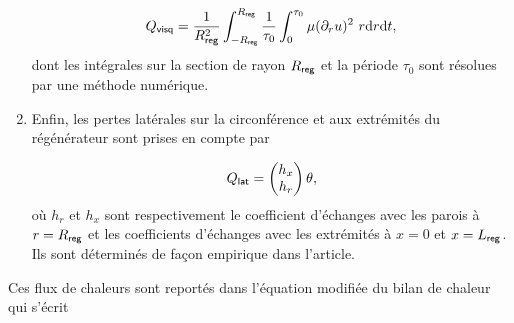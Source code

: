 \begin{enumerate}[label=\textbf{(\roman*)}]
\begin{equation}
Q_{\sf visq} = \frac{1}{R_{\sf reg}^2} \int_{-R_{\sf reg}}^{R_{\sf reg}} \frac{1}{\tau_0} \int_0^{\tau_0} \mu (\partial_r u)^2\ r \mathrm{d} r \mathrm{d} t,
\label{eq:FluxVisq_Lotton}
\end{equation}
dont les intégrales sur la section de rayon $R_{\sf reg}$ et la période $\tau_0$ sont résolues par une méthode numérique.

\item Enfin, les pertes latérales sur la circonférence et aux extrémités du régénérateur sont prises en compte par

\begin{equation}
Q_{\sf lat} = \begin{pmatrix}h_x\\h_r\end{pmatrix} \theta,
\label{eq:FluxLat_Lotton}
\end{equation}
où $h_r$ et $h_x$ sont respectivement le coefficient d'échanges avec les parois à $r = R_{\sf reg}$ et les coefficients d'échanges avec les extrémités à $x=0$ et $x=L_{\sf reg}$. Ils sont déterminés de façon empirique dans l'article.

%
%

\end{enumerate} 

Ces flux de chaleurs sont reportés dans l'équation modifiée du bilan de chaleur qui s'écrit


